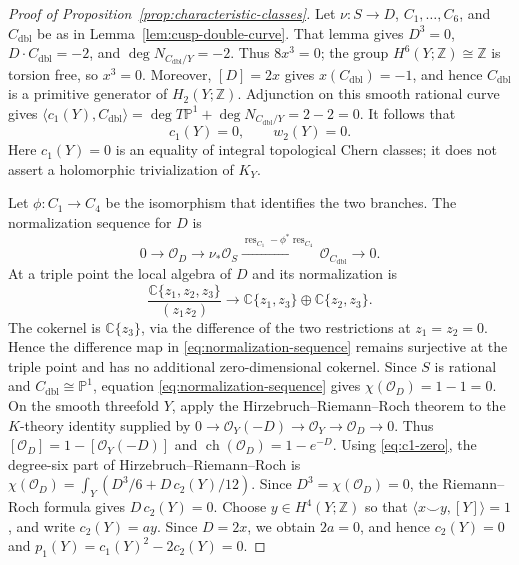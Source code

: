 \documentclass[11pt]{article}
\theoremstyle{definition}
\theoremstyle{remark}
\numberwithin{equation}{section}
\begin{document}
\begin{proof}[Proof of Proposition~\ref{prop:characteristic-classes}]
Let $\nu:S\to D$, $C_1,\ldots,C_6$, and
$C_{\mathrm{dbl}}$ be as in Lemma~\ref{lem:cusp-double-curve}.  That lemma
gives $D^3=0$, $D\cdot C_{\mathrm{dbl}}=-2$, and
$\deg N_{C_{\mathrm{dbl}}/Y}=-2$.
Thus $8x^3=0$; the group $H^6(Y;\mathbb Z)\cong\mathbb Z$ is
torsion free, so $x^3=0$.  Moreover,
$[D]=2x$ gives $x(C_{\mathrm{dbl}})=-1$, and hence
$C_{\mathrm{dbl}}$ is a primitive generator of
$H_2(Y;\mathbb Z)$.  Adjunction on this smooth rational curve gives
$\langle c_1(Y),C_{\mathrm{dbl}}\rangle
=\deg T\mathbb P^1+\deg N_{C_{\mathrm{dbl}}/Y}=2-2=0$.
It follows that
\begin{equation}\label{eq:c1-zero}
 c_1(Y)=0,\qquad w_2(Y)=0.
\end{equation}
Here $c_1(Y)=0$ is an equality of integral topological Chern classes; it
does not assert a holomorphic trivialization of $K_Y$.

Let $\phi:C_1\to C_4$ be the isomorphism that identifies the two branches.
The normalization sequence for $D$ is
\begin{equation}\label{eq:normalization-sequence}
 0\longrightarrow\mathcal O_D
 \longrightarrow\nu_*\mathcal O_S
 \xrightarrow{\operatorname{res}_{C_1}
  -\phi^*\operatorname{res}_{C_4}}
 \mathcal O_{C_{\mathrm{dbl}}}\longrightarrow0.
\end{equation}
At a triple point the local algebra of $D$ and its normalization is
\[
 \frac{\mathbb C\{z_1,z_2,z_3\}}{(z_1z_2)}
 \longrightarrow
 \mathbb C\{z_1,z_3\}\oplus\mathbb C\{z_2,z_3\}.
\]
The cokernel is $\mathbb C\{z_3\}$, via the difference of the two
restrictions at $z_1=z_2=0$.  Hence the difference map in
\eqref{eq:normalization-sequence} remains surjective at the triple point and
has no additional zero-dimensional cokernel.  Since $S$ is
rational and $C_{\mathrm{dbl}}\cong\mathbb P^1$, equation
\eqref{eq:normalization-sequence} gives $\chi(\mathcal O_D)=1-1=0$.
On the smooth threefold $Y$, apply the Hirzebruch--Riemann--Roch theorem
to the $K$-theory identity supplied by
$0\to\mathcal O_Y(-D)\to\mathcal O_Y\to\mathcal O_D\to0$.
Thus $[\mathcal O_D]=1-[\mathcal O_Y(-D)]$ and
$\operatorname{ch}(\mathcal O_D)=1-e^{-D}$.  Using
\eqref{eq:c1-zero}, the degree-six part of Hirzebruch--Riemann--Roch is
$\chi(\mathcal O_D)
=\int_Y(D^3/6+D\,c_2(Y)/12)$.
Since $D^3=\chi(\mathcal O_D)=0$, the Riemann--Roch formula gives
$D\,c_2(Y)=0$.  Choose $y\in H^4(Y;\mathbb Z)$ so that
$\langle x\smile y,[Y]\rangle=1$, and write
$c_2(Y)=ay$.  Since $D=2x$, we obtain $2a=0$, and hence
$c_2(Y)=0$ and $p_1(Y)=c_1(Y)^2-2c_2(Y)=0$.
\end{proof}
\end{document}
